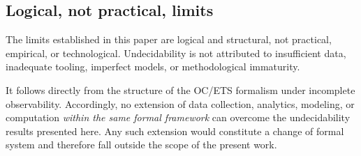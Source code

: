 \subsection{Logical, not practical, limits}
\label{subsec:logical-limits}

The limits established in this paper are logical and structural, not
practical, empirical, or technological. Undecidability is not
attributed to insufficient data, inadequate tooling, imperfect models,
or methodological immaturity.

It follows directly from the structure of the OC/ETS formalism under
incomplete observability. Accordingly, no extension of data collection,
analytics, modeling, or computation \emph{within the same formal
framework} can overcome the undecidability results presented here.
Any such extension would constitute a change of formal system and
therefore fall outside the scope of the present work.
